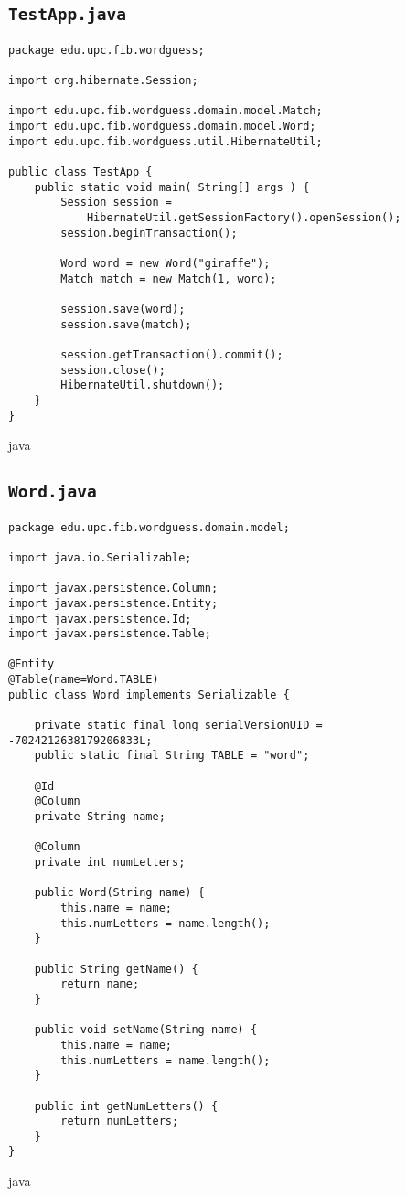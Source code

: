 \subsection{\texttt{TestApp.java}}
\begin{verbatim}
package edu.upc.fib.wordguess;

import org.hibernate.Session;

import edu.upc.fib.wordguess.domain.model.Match;
import edu.upc.fib.wordguess.domain.model.Word;
import edu.upc.fib.wordguess.util.HibernateUtil;

public class TestApp {
    public static void main( String[] args ) {
        Session session = 
            HibernateUtil.getSessionFactory().openSession();
        session.beginTransaction();

        Word word = new Word("giraffe");
        Match match = new Match(1, word);

        session.save(word);
        session.save(match);

        session.getTransaction().commit();
        session.close();
        HibernateUtil.shutdown();
    }
}
\end{verbatim}{java}


\subsection{\texttt{Word.java}}
\begin{verbatim}
package edu.upc.fib.wordguess.domain.model;

import java.io.Serializable;

import javax.persistence.Column;
import javax.persistence.Entity;
import javax.persistence.Id;
import javax.persistence.Table;

@Entity
@Table(name=Word.TABLE)
public class Word implements Serializable {

    private static final long serialVersionUID = -7024212638179206833L;
    public static final String TABLE = "word";

    @Id
    @Column
    private String name;

    @Column
    private int numLetters;

    public Word(String name) {
        this.name = name;
        this.numLetters = name.length();
    }

    public String getName() {
        return name;
    }

    public void setName(String name) {
        this.name = name;
        this.numLetters = name.length();
    }

    public int getNumLetters() {
        return numLetters;
    }
}
\end{verbatim}{java}


